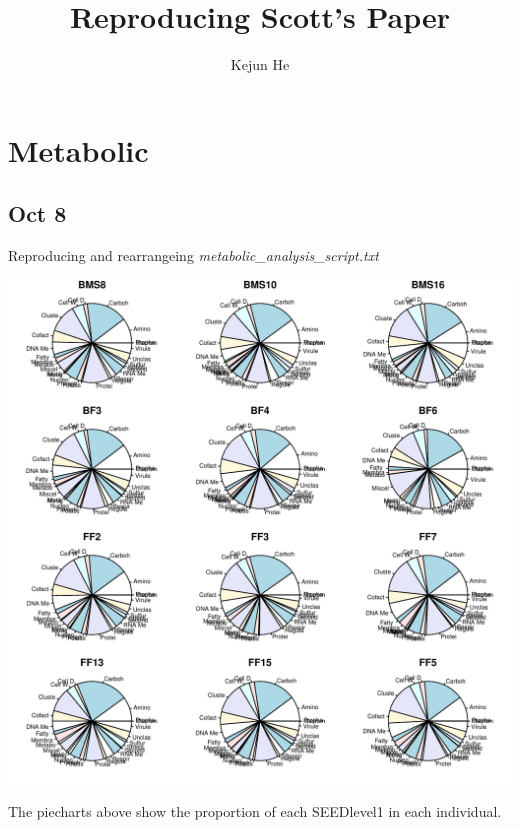 \documentclass{article}\usepackage[]{graphicx}\usepackage[]{color}
\makeatletter
\def\maxwidth{ %
  \ifdim\Gin@nat@width>\linewidth
    \linewidth
  \else
    \Gin@nat@width
  \fi
}
\makeatother
\begin{document}
\title{Reproducing Scott's Paper}
\author{Kejun He}

\maketitle

\tableofcontents

\section{Metabolic}
 \subsection{Oct 8}
   Reproducing and rearrangeing  \textit{metabolic\_\ignorespaces analysis\_\ignorespaces script.txt}
   \begin{center}
\begin{Schunk}


{\centering \includegraphics[width=\maxwidth]{figure/Oct_8-1} 

}

\end{Schunk}
   \end{center}
   The piecharts above show the proportion of each SEEDlevel1 in each individual. 
  $ $
  \newpage
  
\end{document}
